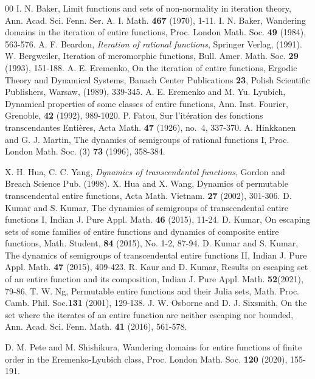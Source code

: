 \documentclass[a4paper,12pt]{amsart}
\numberwithin{equation}{section}
\begin{document}
\begin{thebibliography}{00}
 I. N. Baker, Limit functions and sets of non-normality in iteration theory, Ann. Acad. Sci. Fenn. Ser. A. I. Math. \textbf{467} (1970), 1-11. 
 I. N. Baker, Wandering domains in the iteration of entire functions, Proc. London Math. Soc. \textbf{49} (1984), 563-576.
 A. F. Beardon, \emph{Iteration of rational functions}, Springer Verlag, (1991).
 W. Bergweiler, Iteration of meromorphic functions, Bull. Amer. Math. Soc. \textbf{29} (1993), 151-188.
 A. E. Eremenko, On the iteration of entire functions, Ergodic Theory and Dynamical Systems, Banach Center Publications \textbf{23}, Polish Scientific Publishers, Warsaw, (1989), 339-345.
 A. E. Eremenko and M. Yu. Lyubich, Dynamical properties of some classes of entire functions, Ann. Inst. Fourier, Grenoble, \textbf{42} (1992), 989-1020.
  P. Fatou, Sur l'it\'eration des fonctions transcendantes Enti\`eres, Acta Math. {\bf 47} (1926), no.~4, 337-370. 
 A. Hinkkanen and G. J. Martin, The dynamics of semigroups of rational functions I, Proc. London Math. Soc. (3) \textbf{73} (1996), 358-384.

 X. H. Hua, C. C. Yang, \emph{Dynamics of transcendental functions}, Gordon and Breach Science Pub. (1998).
 X. Hua and X. Wang,  Dynamics of permutable transcendental entire functions, Acta Math. Vietnam. \textbf{27} (2002), 301-306.
 D. Kumar and S. Kumar, The dynamics of semigroups of transcendental entire functions I,  Indian J. Pure Appl. Math. \textbf{46} (2015), 11-24.
 D. Kumar, On escaping sets of some families of entire functions and dynamics of composite entire functions, Math. Student, \textbf{84} (2015), No. 1-2, 87-94.
 D. Kumar and S. Kumar, The dynamics of semigroups of transcendental entire functions II,  Indian J. Pure Appl. Math. \textbf{47} (2015), 409-423.
 R. Kaur and D. Kumar, Results on escaping set of an entire function and its composition,  Indian J. Pure Appl. Math. \textbf{52}(2021), 79-86.
 T. W. Ng, Permutable entire functions and their Julia sets, Math. Proc. Camb. Phil. Soc.\textbf{131} (2001), 129-138.
 J. W. Osborne and D. J. Sixsmith, On the set where the iterates of an entire function are neither escaping nor bounded, Ann. Acad. Sci. Fenn. Math.  \textbf{41} (2016), 561-578.

 D. M. Pete  and M. Shishikura, Wandering domains for entire functions of finite order in the Eremenko-Lyubich class, Proc. London Math. Soc. \textbf{120}  (2020), 155-191. 


\end{thebibliography}
\end{document}
